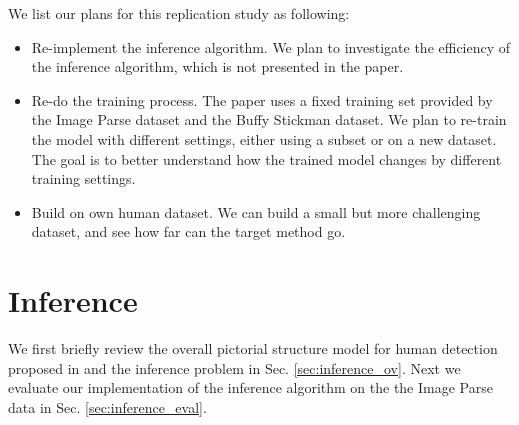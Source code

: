 \documentclass[10pt,twocolumn,letterpaper]{article}
\begin{document}
We list our plans for this replication study as following:
\begin{itemize}
  \item Re-implement the inference algorithm. We plan to investigate the efficiency of the inference algorithm, which is not presented in the paper.
  \item Re-do the training process. The paper uses a fixed training set provided by the Image Parse dataset and the Buffy Stickman dataset. We plan to re-train the model with different settings, either using a subset or on a new dataset. The goal is to better understand how the trained model changes by different training settings. 
  \item Build on own human dataset. We can build a small but more challenging dataset, and see how far can the target method go.
  
\end{itemize}

\section{Inference}
We first briefly review the overall pictorial structure model for human detection proposed in \cite{Yang_PAMI2011} and the inference problem in Sec. \ref{sec:inference_ov}. Next we evaluate our implementation of the inference algorithm on the the Image Parse data \cite{Ramanan_NIPS2006} in Sec. \ref{sec:inference_eval}.
\end{document}
